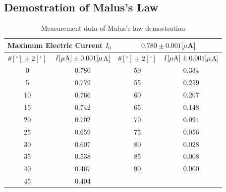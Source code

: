 \documentclass{my_template}
\begin{document}
    \subsection{Demostration of Malus's Law}\label{sec:malus}
    \begin{table}[!ht]
        \centering
        \begin{tabular}{|c|c||c|c|}
            \hline
            \multicolumn{2}{|c||}{Maximum Electric Current $I_0$}&\multicolumn{2}{c|}{$0.780\pm 0.001[\mu$A]}\\\hline
            $\theta[^\circ]\pm 2[^\circ]$&$I[\mu{\rm A}]\pm 0.001[\mu$A]&$\theta[^\circ]\pm 2[^\circ]$&$I[\mu{\rm A}]\pm 0.001[\mu$A]\\\hline
            0&0.780&50&0.334\\\hline
            5&0.779&55&0.259\\\hline
            10&0.766&60&0.207\\\hline
            15&0.742&65&0.148\\\hline
            20&0.702&70&0.094\\\hline
            25&0.659&75&0.056\\\hline
            30&0.607&80&0.028\\\hline
            35&0.538&85&0.008\\\hline
            40&0.467&90&0.000\\\hline
            45&0.404&&\\\hline
        \end{tabular}
        \caption{Measurement data of Malus's law demostration}
        \label{tab:Malus's Law}
    \end{table}
\end{document}
